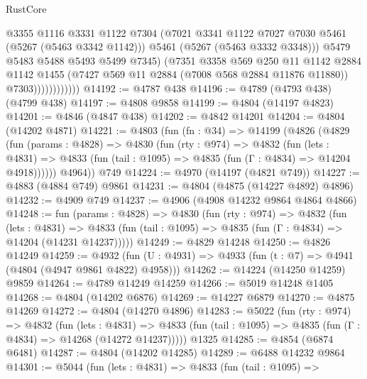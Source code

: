 \begin{lexlean}{RustCore}
\begin{coremodule}
                              @3355
                              @1116
                              @3331
                              @1122
                              @7304
                              (@7021 @3341 @1122 @7027 @7030 @5461 (@5267 (@5463 @3342 @1142)))
                              @5461
                              (@5267 (@5463 @3332 @3348)))
                            @5479
                            @5483
                            @5488
                            @5493
                            @5499
                            @7345)
                          (@7351
                            @3358
                            @569
                            @250
                            @11
                            @1142
                            @2884
                            @1142
                            @1455
                            (@7427 @569 @11 @2884 (@7008 @568 @2884 @11876 @11880))
                            @7303))))))))))))
@14192 := @4787 @438
@14196 := @4789 (@4793 @438) (@4799 @438)
@14197 := @4808 @9858
@14199 := @4804 (@14197 @4823)
@14201 := @4846 (@4847 @438)
@14202 := @4842 @14201
@14204 := @4804 (@14202 @4871)
@14221 := @4803
    (fun (fn : @34) =>
    @14199
      (@4826
        (@4829
          (fun (params : @4828) =>
          @4830
            (fun (rty : @974) =>
            @4832
              (fun (lets : @4831) =>
              @4833 (fun (tail : @1095) => @4835 (fun (Γ : @4834) => @14204 @4918))))))
        @4964))
    @749
@14224 := @4970 (@14197 (@4821 @749))
@14227 := @4883 (@4884 @749) @9861
@14231 := @4804 (@4875 (@14227 @4892) @4896)
@14232 := @4909 @749
@14237 := @4906 (@4908 @14232 @9864 @4864 @4866)
@14248 := fun (params : @4828) =>
  @4830
    (fun (rty : @974) =>
    @4832
      (fun (lets : @4831) =>
      @4833 (fun (tail : @1095) => @4835 (fun (Γ : @4834) => @14204 (@14231 @14237)))))
@14249 := @4829 @14248
@14250 := @4826 @14249
@14259 := @4932 (fun (U : @4931) => @4933 (fun (t : @7) => @4941 (@4804 (@4947 @9861 @4822) @4958)))
@14262 := @14224 (@14250 @14259) @9859
@14264 := @4789 @14249 @14259
@14266 := @5019 @14248 @1405
@14268 := @4804 (@14202 @6876)
@14269 := @14227 @6879
@14270 := @4875 @14269
@14272 := @4804 (@14270 @4896)
@14283 := @5022
    (fun (rty : @974) =>
    @4832
      (fun (lets : @4831) =>
      @4833 (fun (tail : @1095) => @4835 (fun (Γ : @4834) => @14268 (@14272 @14237)))))
    @1325
@14285 := @4854 (@6874 @6481)
@14287 := @4804 (@14202 @14285)
@14289 := @6488 @14232 @9864
@14301 := @5044
    (fun (lets : @4831) =>
    @4833
      (fun (tail : @1095) =>

\end{coremodule}
\end{lexlean}
